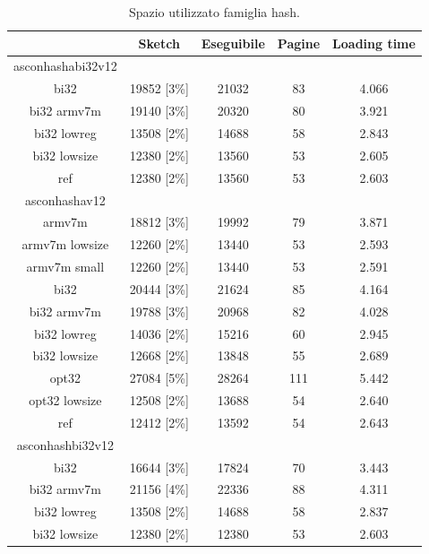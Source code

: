 \documentclass[12pt,a4paper,italian]{report}
\begin{document}
\begin{table}[h]
    \caption{Spazio utilizzato famiglia hash.}
    \centering
	\begin{tabular}{|c|c|c|c|c|}
		\hline
         & Sketch & Eseguibile & Pagine & Loading time \\
        \hline
        asconhashabi32v12 & & & & \\
        \hline
        bi32 & 19852 [3\%] & 21032 & 83 & 4.066 \\
        \hline
        bi32 armv7m & 19140 [3\%] & 20320 & 80 & 3.921 \\
        \hline
        bi32 lowreg & 13508 [2\%] & 14688 & 58 & 2.843 \\
        \hline
        bi32 lowsize & 12380 [2\%] & 13560 & 53 & 2.605 \\
        \hline
        ref & 12380 [2\%] & 13560 & 53 & 2.603 \\
        \hline
        asconhashav12 & & & & \\
        \hline
        armv7m & 18812 [3\%] & 19992 & 79 & 3.871 \\
        \hline
        armv7m lowsize & 12260 [2\%] & 13440 & 53 & 2.593 \\
        \hline
        armv7m small & 12260 [2\%] & 13440 & 53 & 2.591 \\
        \hline
        bi32 & 20444 [3\%] & 21624 & 85 & 4.164 \\
        \hline
        bi32 armv7m & 19788 [3\%] & 20968 & 82 & 4.028 \\
        \hline
        bi32 lowreg & 14036 [2\%] & 15216 & 60 & 2.945 \\
        \hline
        bi32 lowsize & 12668 [2\%] & 13848 & 55 & 2.689 \\
        \hline
        opt32 & 27084 [5\%] & 28264 & 111 & 5.442 \\
        \hline
        opt32 lowsize & 12508 [2\%] & 13688 & 54 & 2.640 \\
        \hline
        ref & 12412 [2\%] & 13592 & 54 & 2.643 \\
        \hline
        asconhashbi32v12 & & & & \\
        \hline
        bi32 & 16644 [3\%] & 17824 & 70 & 3.443 \\
        \hline
        bi32 armv7m & 21156 [4\%] & 22336 & 88 & 4.311 \\
        \hline
        bi32 lowreg & 13508 [2\%] & 14688 & 58 & 2.837 \\
        \hline
        bi32 lowsize & 12380 [2\%] & 12380 & 53 & 2.603 \\

\end{tabular}
\end{table}
\end{document}
